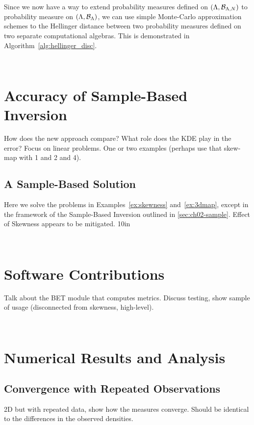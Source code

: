 Since we now have a way to extend probability measures defined on $({\Lambda}, \mathcal{B}_{{\Lambda}, N})$ to  probability measure on $({\Lambda}, \mathcal{B}_{{\Lambda}})$, we can use simple Monte-Carlo approximation schemes to the Hellinger distance between two probability measures defined on two separate computational algebras.
This is demonstrated in Algorithm~\ref{alg:hellinger_disc}.







\
\section{Accuracy of Sample-Based Inversion}\label{sec:ch03-sample}

How does the new approach compare? What role does the KDE play in the error?
Focus on linear problems. One or two examples (perhaps use that skew-map with 1 and 2 and 4).


\subsection{A Sample-Based Solution}\label{eq:sampleskew}

Here we solve the problems in Examples~\ref{ex:skewness} and~\ref{ex:3dmap}, except in the framework of the Sample-Based Inversion outlined in \ref{sec:ch02-sample}.
Effect of Skewness appears to be mitigated.
\vfill{10in}


\
\section{Software Contributions}\label{sec:ch03-software}

Talk about the BET module that computes metrics.
Discuss testing, show sample of usage (disconnected from skewness, high-level).


\
\section{Numerical Results and Analysis}\label{sec:ch03-approx}

\subsection{Convergence with Repeated Observations}
2D but with repeated data, show how the measures converge. Should be identical to the differences in the observed densities.

